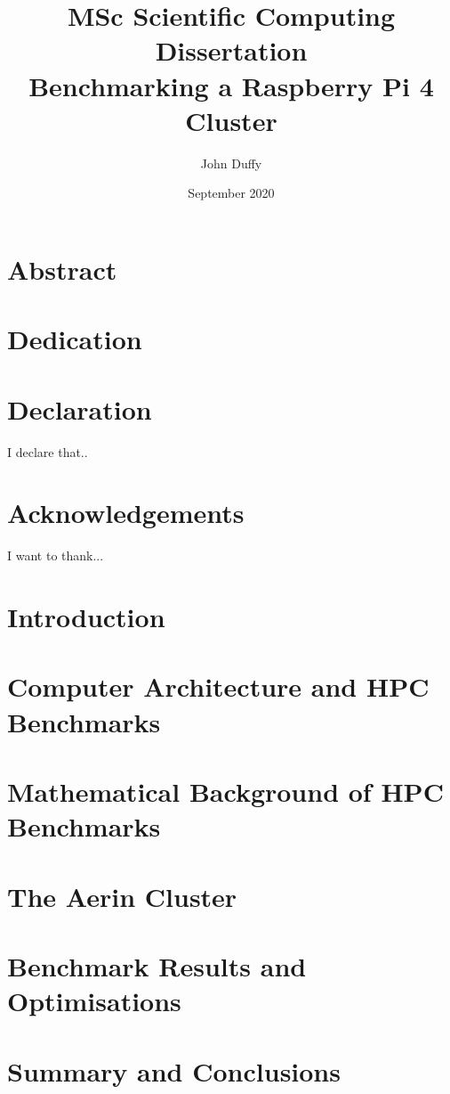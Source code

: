 \documentclass{report}
\title{MSc Scientific Computing Dissertation\\Benchmarking a Raspberry Pi 4 Cluster}
\author{John Duffy}
\date{September 2020}
\begin{document}
%
%
\maketitle
%


%
%
\chapter*{Abstract}
%


%
%
\chapter*{Dedication}


%
% 
\chapter*{Declaration}
I declare that..


%
%
\chapter*{Acknowledgements}
I want to thank...


%
%
\tableofcontents


%
%
\chapter{Introduction}



%
%
\chapter{Computer Architecture and HPC Benchmarks}



%
%
\chapter{Mathematical Background of HPC Benchmarks}



%
%
\chapter{The Aerin Cluster}



%
%
\chapter{Benchmark Results and Optimisations}



%
%
\chapter{Summary and Conclusions}



%
%
\printbibliography[heading=bibintoc, title={References}]
\end{document}
